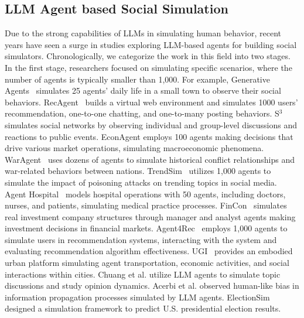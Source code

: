 \documentclass{article}
\theoremstyle{definition}
\theoremstyle{theorem}
\theoremstyle{proof}
\theoremstyle{remark}
\begin{document}
    \subsection{LLM Agent based Social Simulation}
    Due to the strong capabilities of LLMs in simulating human behavior, recent years have seen a surge in studies exploring LLM-based agents for building social simulators.
    Chronologically, we categorize the work in this field into two stages. In the first stage, researchers focused on simulating specific scenarios, where the number of agents is typically smaller than 1,000.
    For example, Generative Agents~\cite{park2023generative} simulates 25 agents' daily life in a small town to observe their social behaviors. RecAgent~\cite{wang2025user} builds a virtual web environment and simulates 1000 users' recommendation, one-to-one chatting, and one-to-many posting behaviors. 
    S$^3$\cite{gao2023s3} simulates social networks by observing individual and group-level discussions and reactions to public events. EconAgent\cite{li2023econagent} employs 100 agents making decisions that drive various market operations, simulating macroeconomic phenomena. WarAgent~\cite{hua2023war} uses dozens of agents to simulate historical conflict relationships and war-related behaviors between nations.
    TrendSim~\cite{zhang2024trendsim} utilizes 1,000 agents to simulate the impact of poisoning attacks on trending topics in social media. Agent Hospital~\cite{li2024agent} models hospital operations with 50 agents, including doctors, nurses, and patients, simulating medical practice processes. FinCon~\cite{yu2024fincon} simulates real investment company structures through manager and analyst agents making investment decisions in financial markets. Agent4Rec~\cite{zhang2024generative} employs 1,000 agents to simulate users in recommendation systems, interacting with the system and evaluating recommendation algorithm effectiveness. UGI~\cite{xu2023urban} provides an embodied urban platform simulating agent transportation, economic activities, and social interactions within cities.
    Chuang et al.\cite{chuang2023simulating} utilize LLM agents to simulate topic discussions and study opinion dynamics. 
    Acerbi et al.\cite{acerbi2023large} observed human-like bias in information propagation processes simulated by LLM agents. ElectionSim\cite{zhang2024electionsim} designed a simulation framework to predict U.S. presidential election results.
\end{document}
